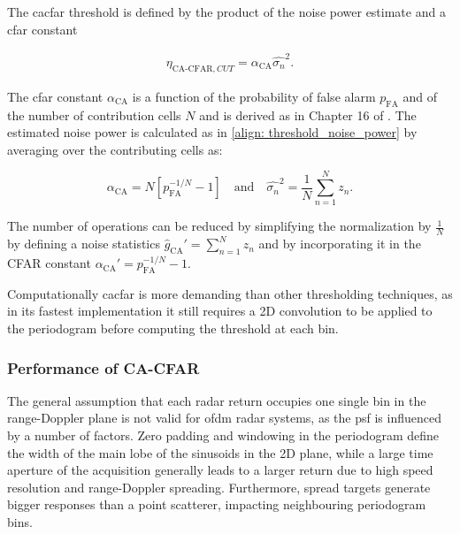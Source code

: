 
The \gls{cacfar} threshold is defined by the product of the noise power estimate and a \gls{cfar} constant

\begin{align}
	\eta_{\text{CA-CFAR},CUT} = \alpha_{\text{CA}} \hat{\sigma_n}^2.
\end{align}

The \gls{cfar} constant $\alpha_{\text{CA}}$ is a function of the probability of false alarm $p_{\text{FA}}$ and of the number of contribution cells $N$ and is derived as in Chapter 16 of \cite{Richards_Scheer_Holm_2010}. The estimated noise power is calculated as in \eqref{align: threshold_noise_power} by averaging over the contributing cells as:

\begin{equation}
	\alpha_{\text{CA}} = N[p_{\text{FA}}^{-1/N} - 1] \quad \text{and} \quad \hat{\sigma_n}^2 = \frac{1}{N}\sum_{n=1}^N z_n.
\end{equation}

The number of operations can be reduced by simplifying the normalization by $\frac{1}{N}$ by defining a noise statistics $\hat{g}_{\text{CA}}' = \sum_{n=1}^N z_n$ and by incorporating it in the CFAR constant $\alpha_{\text{CA}}' = p_{\text{FA}}^{-1/N} - 1$.

Computationally \gls{cacfar} is more demanding than other thresholding techniques, as in its fastest implementation it still requires a 2D convolution to be applied to the periodogram before computing the threshold at each bin.

\subsubsection{Performance of CA-CFAR}

The general assumption that each radar return occupies one single bin in the range-Doppler plane is not valid for \gls{ofdm} radar systems, as the \gls{psf} is influenced by a number of factors.
Zero padding and windowing in the periodogram define the width of the main lobe of the sinusoids in the 2D plane, while a large time aperture of the acquisition generally leads to a larger return due to high speed resolution and range-Doppler spreading.
Furthermore, spread targets generate bigger responses than a point scatterer, impacting neighbouring periodogram bins.

